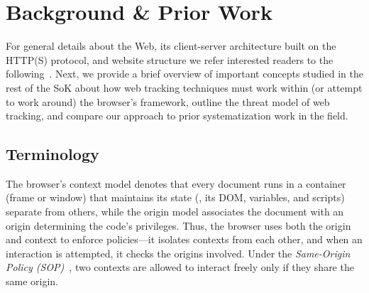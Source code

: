 \section{Background \& Prior Work}
\label{sec:background}

For general details about the Web, its client-server architecture built on the HTTP(S) protocol, and website structure we refer interested readers to the following~. Next, we provide a brief overview of important concepts studied in the rest of the SoK about how web tracking techniques must work within (or attempt to work around) the browser’s framework, outline the threat model of web tracking, and compare our approach to prior systematization work in the field.

\subsection{Terminology}
\label{sec:terminology}

The browser's context model denotes that every document runs in a container (frame or window) that maintains its state (\eg{}, its DOM, variables, and scripts) separate from others, while the origin model associates the document with an origin determining the code’s privileges.
%
Thus, the browser uses both the origin and context to enforce policies---it isolates contexts from each other, and when an interaction is attempted, it checks the origins involved. 
%
Under the \textit{Same-Origin Policy (SOP)}~\cite{mdnSameoriginPolicySecurity2024}, two contexts are allowed to interact freely only if they share the same origin.

